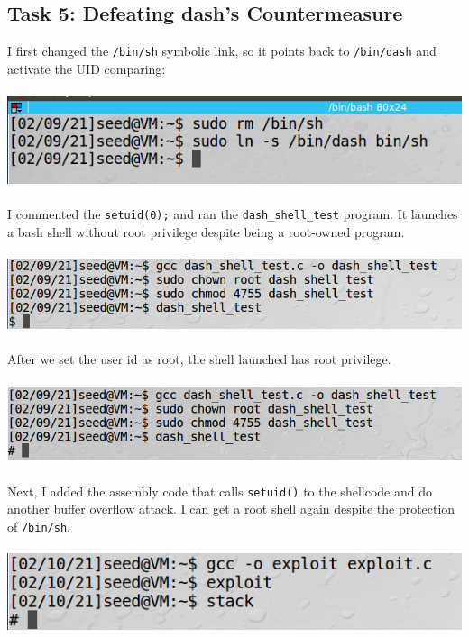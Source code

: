 \documentclass[a4paper]{article}
\begin{document}
\subsection{Task 5: Defeating dash’s Countermeasure}
I first changed the \verb+/bin/sh+ symbolic link, so it points back to \verb+/bin/dash+ and activate the UID comparing:\\\\
\includegraphics[scale=0.7]{2/8.png}\\\\
I commented the \verb+setuid(0);+ and ran the \verb+dash_shell_test+ program. It launches a bash shell without root privilege despite being a root-owned program.\\\\
\includegraphics[scale=0.7]{2/9.png}\\\\
After we set the user id as root, the shell launched has root privilege.\\\\
\includegraphics[scale=0.7]{2/10.png}\\\\
Next, I added the assembly code that calls \verb+setuid()+ to the shellcode and do another buffer overflow attack. I can get a root shell again despite the protection of \verb+/bin/sh+.\\\\
\includegraphics[scale=0.7]{2/12.png}
\end{document}
